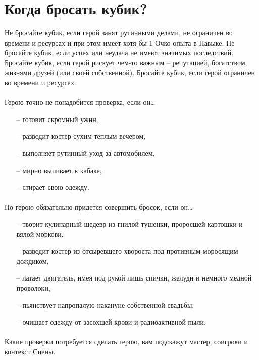 \section{Когда бросать кубик?}
Не бросайте кубик, если герой занят рутинными делами, не ограничен во времени и ресурсах и при этом имеет хотя бы 1 Очко опыта в Навыке. Не бросайте кубик, если успех или неудача не имеют значимых последствий.
Бросайте кубик, если герой рискует чем-то важным – репутацией, богатством, жизнями друзей (или своей собственной). Бросайте кубик, если герой ограничен во времени и ресурсах.
\paragraph{}Герою точно не понадобится проверка, если он…
\begin{itemize}
\item[--]готовит скромный ужин,
\item[--]разводит костер сухим теплым вечером,
\item[--]выполняет рутинный уход за автомобилем,
\item[--]мирно выпивает в кабаке,
\item[--]стирает свою одежду.
\end{itemize}
\paragraph{}Но герою обязательно придется совершить бросок, если он…
\begin{itemize}
\item[--]творит кулинарный шедевр из гнилой тушенки, проросшей картошки и вялой моркови,
\item[--]разводит костер из отсыревшего хвороста под противным моросящим дождиком,
\item[--]латает двигатель, имея под рукой лишь спички, желуди и немного медной проволоки,
\item[--]пьянствует напропалую накануне собственной свадьбы,
\item[--]очищает одежду от засохшей крови и радиоактивной пыли.
\end{itemize}
\paragraph{}Какие проверки потребуется сделать герою, вам подскажут мастер, соигроки и контекст Сцены.